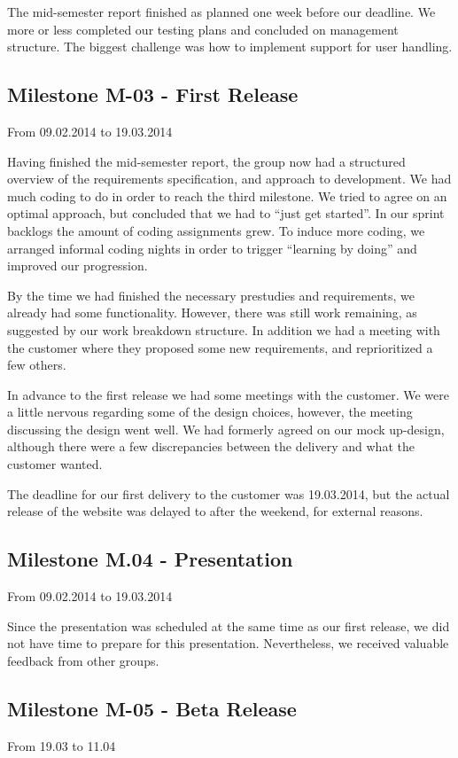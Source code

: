 The mid-semester report finished as planned one week before our
deadline. We more or less completed our testing plans and concluded on
management structure. The biggest challenge was how to implement
support for user handling. 

\subsection{Milestone M-03 - First Release}
\label{sec:M03}
From 09.02.2014 to 19.03.2014

Having finished the mid-semester report, the group now had a structured
overview of the requirements specification, and approach
to development. We had much coding to do in order to reach the third
milestone. We tried to agree on an optimal approach, but concluded that
we had to ``just get started''. In
our sprint backlogs the amount of coding assignments grew. To induce
more coding, we arranged informal coding nights in order to trigger
``learning by doing'' and improved
our progression.

By the time we had finished the necessary prestudies and requirements,
we already had some functionality. However, there was still work
remaining, as suggested by our work breakdown structure. In addition we
had a meeting with the customer where they proposed some new
requirements, and reprioritized a few others. 

In advance to the first release we had some meetings with the customer.
We were a little nervous regarding some of the design choices, however, the
meeting discussing the design went well. We had formerly agreed on our
mock up-design, although there were a few discrepancies between the
delivery and what the customer wanted. \ 

The deadline for our first delivery to the customer was 19.03.2014, but the actual release of
the website was delayed to after the weekend, for external reasons. 

\subsection{Milestone M.04 - Presentation}
\label{sec:M04}
From 09.02.2014 to 19.03.2014

Since the presentation was scheduled at the same time as our first
release, we did not have time to prepare for this presentation.
Nevertheless, we received valuable feedback from other groups.

\subsection{Milestone M-05 - Beta Release}
\label{sec:M05}
From 19.03 to 11.04

